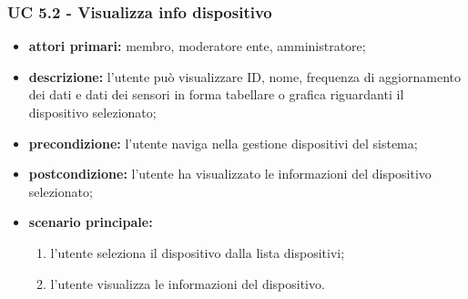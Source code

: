 			\subsubsection{UC 5.2 - Visualizza info dispositivo}
			\begin{itemize}
				\item \textbf{attori primari:} membro, moderatore ente, amministratore;
				\item \textbf{descrizione:} l'utente può visualizzare ID, nome, frequenza di aggiornamento dei dati e dati dei sensori in forma tabellare o grafica riguardanti il dispositivo selezionato;
				\item \textbf{precondizione:} l'utente naviga nella gestione dispositivi del sistema;
				\item \textbf{postcondizione:} l'utente ha visualizzato le informazioni del dispositivo selezionato;
				\item \textbf{scenario principale:}
				\begin{enumerate}
					\item{l'utente seleziona il dispositivo dalla lista dispositivi;}
					\item{l'utente visualizza le informazioni del dispositivo.}
				\end{enumerate}
			\end{itemize}

